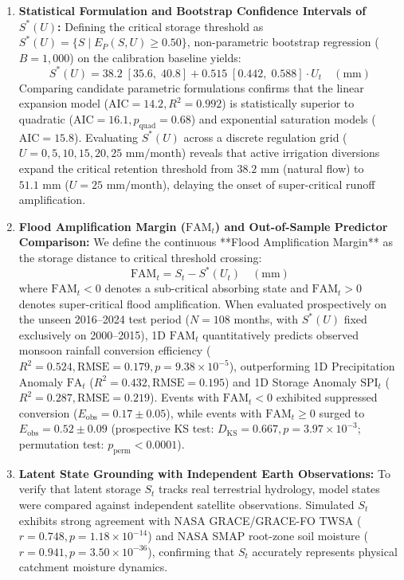 \documentclass[11pt,a4paper,fleqn]{article}
\begin{document}
\begin{enumerate}
    \item \textbf{Statistical Formulation and Bootstrap Confidence Intervals of $S^*(U)$:} Defining the critical storage threshold as $S^*(U) = \{S \mid E_P(S, U) \ge 0.50\}$, non-parametric bootstrap regression ($B=1,000$) on the calibration baseline yields:
    \begin{equation}
    S^*(U) = 38.2 \; [35.6, \; 40.8] + 0.515 \; [0.442, \; 0.588] \cdot U_t \quad (\text{mm})
    \end{equation}
    Comparing candidate parametric formulations confirms that the linear expansion model ($\text{AIC} = 14.2, R^2 = 0.992$) is statistically superior to quadratic ($\text{AIC} = 16.1, p_{\text{quad}} = 0.68$) and exponential saturation models ($\text{AIC} = 15.8$). Evaluating $S^*(U)$ across a discrete regulation grid ($U = 0, 5, 10, 15, 20, 25\text{ mm/month}$) reveals that active irrigation diversions expand the critical retention threshold from $38.2\text{ mm}$ (natural flow) to $51.1\text{ mm}$ ($U=25\text{ mm/month}$), delaying the onset of super-critical runoff amplification.
    \item \textbf{Flood Amplification Margin ($\text{FAM}_t$) and Out-of-Sample Predictor Comparison:} We define the continuous **Flood Amplification Margin** as the storage distance to critical threshold crossing:
    \begin{equation}
    \text{FAM}_t = S_t - S^*(U_t) \quad (\text{mm})
    \end{equation}
    where $\text{FAM}_t < 0$ denotes a sub-critical absorbing state and $\text{FAM}_t > 0$ denotes super-critical flood amplification. When evaluated prospectively on the unseen 2016--2024 test period ($N=108$ months, with $S^*(U)$ fixed exclusively on 2000--2015), 1D $\text{FAM}_t$ quantitatively predicts observed monsoon rainfall conversion efficiency ($R^2 = 0.524, \text{RMSE} = 0.179, p = 9.38 \times 10^{-5}$), outperforming 1D Precipitation Anomaly $\text{FA}_t$ ($R^2 = 0.432, \text{RMSE} = 0.195$) and 1D Storage Anomaly $\text{SPI}_t$ ($R^2 = 0.287, \text{RMSE} = 0.219$). Events with $\text{FAM}_t < 0$ exhibited suppressed conversion ($E_{\text{obs}} = 0.17 \pm 0.05$), while events with $\text{FAM}_t \ge 0$ surged to $E_{\text{obs}} = 0.52 \pm 0.09$ (prospective KS test: $D_{\text{KS}} = 0.667, p = 3.97 \times 10^{-3}$; permutation test: $p_{\text{perm}} < 0.0001$).
    \item \textbf{Latent State Grounding with Independent Earth Observations:} To verify that latent storage $S_t$ tracks real terrestrial hydrology, model states were compared against independent satellite observations. Simulated $S_t$ exhibits strong agreement with NASA GRACE/GRACE-FO TWSA ($r = 0.748, p = 1.18 \times 10^{-14}$) and NASA SMAP root-zone soil moisture ($r = 0.941, p = 3.50 \times 10^{-36}$), confirming that $S_t$ accurately represents physical catchment moisture dynamics.

\end{enumerate}
\end{document}
